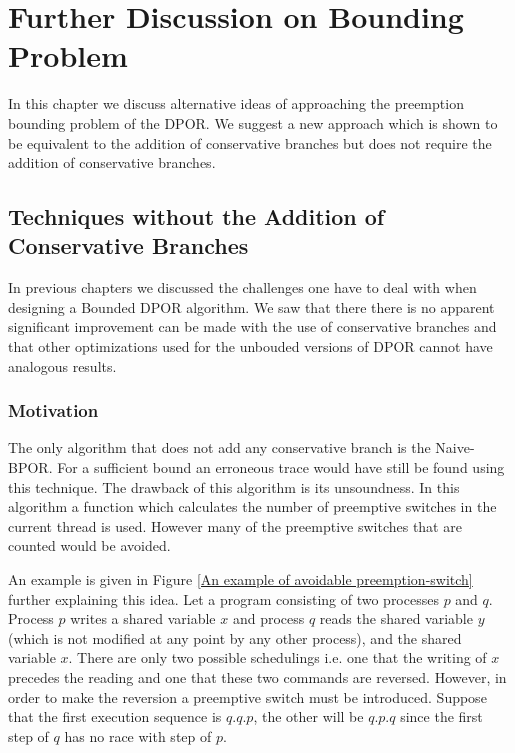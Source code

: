 \chapter{Further Discussion on Bounding Problem}
\label{Chapter 5}

In this chapter we discuss alternative ideas of approaching the preemption bounding problem of the DPOR. 
We suggest a new approach which is shown to be equivalent to the addition of conservative branches but does not require the addition of conservative
branches.

\section{Techniques without the Addition of Conservative Branches}

In previous chapters we discussed the challenges one have to deal with when designing a Bounded DPOR algorithm. We saw that there there is 
no apparent significant improvement can be made with the use of conservative branches and that other optimizations used for the unbouded versions of DPOR
cannot have analogous results. 

\subsection{Motivation}
The only algorithm that does not add any conservative branch is the Naive-BPOR. For a sufficient bound an erroneous
trace would have still be found using this technique. The drawback of this algorithm is its unsoundness. In this
algorithm a function which calculates the number of preemptive switches in the current thread is used. However many of
the preemptive switches that are counted would be avoided.

An example is given in Figure \ref{An example of avoidable preemption-switch} further explaining this idea. Let
a program consisting of two processes $p$ and $q$. Process $p$ writes a shared variable $x$ and process $q$ reads
the shared variable $y$ (which is not modified at any point by any other process), and the shared variable $x$. There
are only two possible schedulings i.e. one that the writing of $x$ precedes the reading and one that these two commands
are reversed. However, in order to make the reversion a preemptive switch must be introduced. Suppose that the first
execution sequence is $q.q.p$, the other will be $q.p.q$ since the first step of $q$ has no race with step of $p$.


